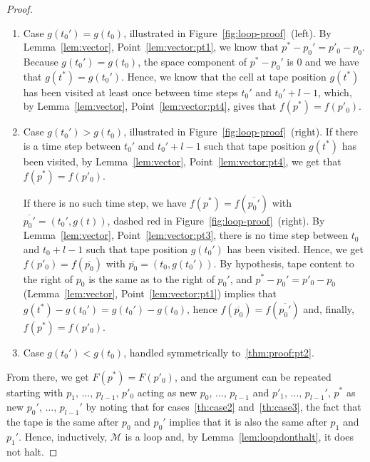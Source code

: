 \begin{proof}
    \begin{enumerate}
        \item Case $g(t_0') = g(t_0)$, illustrated in Figure~\ref{fig:loop-proof}~(left).  By Lemma~\ref{lem:vector}, Point~\ref{lem:vector:pt1}, we know that $p^*-p_0' = p'_0 - p_0$. Because $g(t_0') = g(t_0)$, the space component of $p^*-p_0'$ is 0 and we have that $g(t^*) = g(t_0')$. Hence, we know that the cell at tape position $g(t^*)$ has been visited at least once between time steps $t_0'$ and $t_0'+l-1$, which, by Lemma~\ref{lem:vector}, Point~\ref{lem:vector:pt4}, gives that $f(p^*) = f(p'_0)$.

        \item Case $g(t_0') > g(t_0)$, illustrated in Figure~\ref{fig:loop-proof}~(right). If there is a time step between $t_0'$ and $t_0'+l-1$ such that tape position $g(t^*)$ has been visited, by Lemma~\ref{lem:vector}, Point~\ref{lem:vector:pt4}, we get that $f(p^*) = f(p'_0)$.

              If there is no such time step, we have $f(p^*) = f(\overline{p_0'})$ with $\overline{p_0'} = (t_0',g(t))$, dashed red in Figure~\ref{fig:loop-proof}~(right). By Lemma~\ref{lem:vector}, Point~\ref{lem:vector:pt3}, there is no time step between $t_0$ and $t_0+l-1$ such that tape position $g(t_0')$ has been visited. Hence, we  get $f(p'_0) = f(\overline{p_0})$ with $\overline{p_0} = (t_0,g(t_0'))$. By hypothesis, tape content to the right of $p_0$ is the same as to the right of $p_0'$, and $p^*-p_0' = p'_0 - p_0$ (Lemma~\ref{lem:vector}, Point~\ref{lem:vector:pt1}) implies that $g(t^*)-g(t_0') = g(t_0') - g(t_0)$, hence $f(\overline{p_0}) = f(\overline{p_0'})$ and, finally, $f(p^*) = f(p'_0)$.\label{thm:proof:pt2}
        \item Case $g(t_0') < g(t_0)$, handled symmetrically to~\ref{thm:proof:pt2}.
    \end{enumerate}
    From there, we get $F(p^*) = F(p'_0)$, and the argument can be repeated starting with $p_1,\, \dots,\, p_{l-1},\, p'_0$ acting as new $p_0,\,\dots,\,p_{l-1}$ and $p'_1,\, \dots,\, p_{l-1}',\, p^*$ as new $p_0',\,\dots,\,p_{l-1}'$ by noting that for cases~\ref{th:case2} and~\ref{th:case3}, the fact that the tape is the same after $p_0$ and $p_0'$ implies that it is also the same after $p_1$ and $p_1'$. Hence, inductively, $\mathcal{M}$ is a loop and, by Lemma~\ref{lem:loopdonthalt}, it does not halt.
\end{proof}

